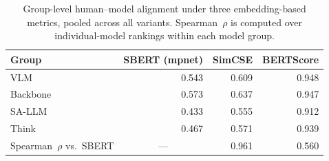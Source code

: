 \begin{table}[h]
\centering
\small


\begin{tabular}{lrrr}
\toprule
Group & SBERT (mpnet) & SimCSE & BERTScore \\
\midrule
VLM & 0.543 & 0.609 & 0.948 \\
Backbone & 0.573 & 0.637 & 0.947 \\
SA-LLM & 0.433 & 0.555 & 0.912 \\
Think & 0.467 & 0.571 & 0.939 \\
\midrule
Spearman~$\rho$ vs.\ SBERT & \multicolumn{1}{c}{---} & 0.961 & 0.560 \\
\bottomrule
\end{tabular}
\caption{Group-level human--model alignment under three embedding-based metrics, pooled across all variants. Spearman~$\rho$ is computed over individual-model rankings within each model group.}
\label{tab:robustness_embedding}
\end{table}
